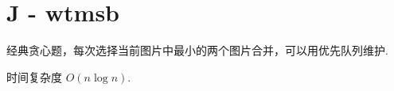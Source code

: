\documentclass{ctexart}
\begin{document}
\section*{J - wtmsb}

经典贪心题，每次选择当前图片中最小的两个图片合并，可以用优先队列维护.

时间复杂度 $O(n\log{n})$.
\end{document}
